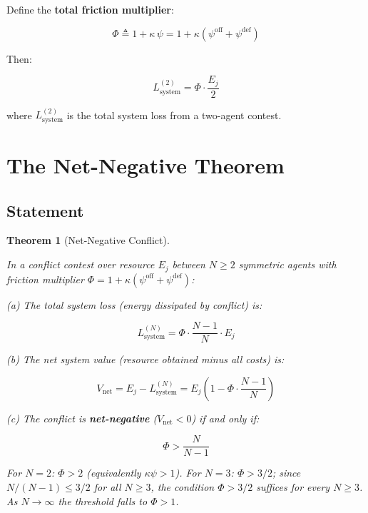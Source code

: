 \documentclass[11pt]{article}
\theoremstyle{plain}
\newtheorem{theorem}{Theorem}
\theoremstyle{definition}
\theoremstyle{remark}
\let\origsection\section
\renewcommand{\section}{\needspace{12\baselineskip}\origsection}
\let\origsubsection\subsection
\renewcommand{\subsection}{\needspace{7\baselineskip}\origsubsection}
\begin{document}
Define the \textbf{total friction multiplier}:

\[\Phi \triangleq 1 + \kappa \, \psi = 1 + \kappa(\psi^{\text{off}} + \psi^{\text{def}})\]

Then:

\[L_{\text{system}}^{(2)} = \Phi \cdot \frac{E_j}{2}\]

where \(L_{\text{system}}^{(2)}\) is the total system loss from a
two-agent contest.

\section{The Net-Negative Theorem}\label{the-net-negative-theorem}

\subsection{Statement}\label{statement}

\begin{theorem}[Net-Negative Conflict]
\label{thm-net-negative-conflict}

In a conflict contest over resource $E_j$ between $N \geq 2$ symmetric agents with friction multiplier $\Phi = 1 + \kappa(\psi^{\text{off}} + \psi^{\text{def}})$:

(a) The total system loss (energy dissipated by conflict) is:

$$L_{\text{system}}^{(N)} = \Phi \cdot \frac{N - 1}{N} \cdot E_j$$

(b) The net system value (resource obtained minus all costs) is:

$$V_{\text{net}} = E_j - L_{\text{system}}^{(N)} = E_j \left(1 - \Phi \cdot \frac{N - 1}{N}\right)$$

(c) The conflict is \textbf{net-negative} ($V_{\text{net}} < 0$) if and only if:

$$\Phi > \frac{N}{N - 1}$$

For $N = 2$: $\Phi > 2$ (equivalently $\kappa\psi > 1$). For $N = 3$: $\Phi > 3/2$; since $N/(N-1) \leq 3/2$ for all $N \geq 3$, the condition $\Phi > 3/2$ suffices for every $N \geq 3$. As $N \to \infty$ the threshold falls to $\Phi > 1$.
\end{theorem}
\end{document}
